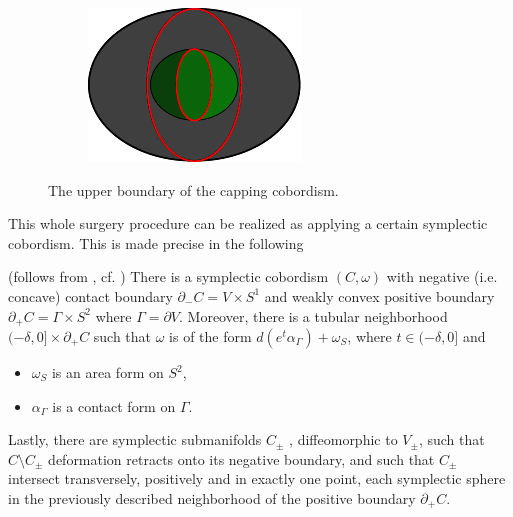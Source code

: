 \begin{figure}[h!]
\begin{subfigure}{.9\linewidth}
    \end{subfigure}
    \begin{subfigure}{.9\linewidth}
        \centering
        \includegraphics[trim=-.5cm -.5cm -.5cm -.5cm, width=.5\linewidth]{images/gamma_times_s2.pdf}
    \end{subfigure}
    \caption[short]{The upper boundary of the capping cobordism.}
    \label{fig:cap_cobordism}
\end{figure}

This whole surgery procedure can be realized as applying a certain symplectic cobordism.
This is made precise in the following
\begin{lemma}(follows from \cite[Theorem 6.1]{MNW13}, cf. \cite[Lemma 6.1]{BGM22})\label{lem:capping_cobordism}
    There is a symplectic cobordism $(C, \omega)$ with negative (i.e. concave) 
    contact boundary $\partial_-C = V \times S^1$ and weakly convex positive boundary
    $\partial_+ C = \Gamma \times S^2$ where $\Gamma = \partial V$. 
    Moreover, there is a tubular neighborhood $(-\delta, 0] \times \partial_+ C$
    such that $\omega$ is of the form $d(e^t \alpha_\Gamma) + \omega_S$, 
    where $t \in (-\delta, 0]$ and 
    \begin{itemize}
        \item $\omega_S$ is an area form on $S^2$,
        \item $\alpha_\Gamma$ is a contact form on $\Gamma$.
    \end{itemize}
    Lastly, there are symplectic submanifolds $C_\pm$ , diffeomorphic to $V_\pm$, 
    such that $C\setminus C_\pm$ deformation retracts onto its negative boundary, 
    and such that $C_\pm$ intersect transversely, positively and in exactly one point, 
    each symplectic sphere in the previously described neighborhood 
    of the positive boundary $\partial_+ C$.
\end{lemma}


